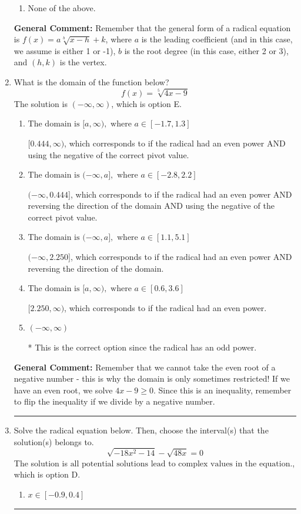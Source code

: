\documentclass{extbook}[14pt]
\newcommand{\litem}[1]{\item #1

\rule{\textwidth}{0.4pt}}
\begin{document}
\begin{enumerate}
{\begin{enumerate}[label=\Alph*.]
\item None of the above.\end{enumerate}
\textbf{General Comment:} Remember that the general form of a radical equation is $ f(x) = a \sqrt[b]{x - h} + k $, where $a$ is the leading coefficient (and in this case, we assume is either 1 or -1), $b$ is the root degree (in this case, either 2 or 3), and $(h, k)$ is the vertex.
}
\litem{
What is the domain of the function below?
\[ f(x) = \sqrt[5]{4 x - 9} \]
The solution is \( (-\infty, \infty) \), which is option E.\begin{enumerate}[label=\Alph*.]
\item \( \text{The domain is } [a, \infty), \text{   where } a \in [-1.7, 1.3] \)

$[0.444, \infty)$, which corresponds to if the radical had an even power AND using the negative of the correct pivot value.
\item \( \text{The domain is } (-\infty, a], \text{   where } a \in [-2.8, 2.2] \)

$(-\infty, 0.444]$, which corresponds to if the radical had an even power AND reversing the direction of the domain AND using the negative of the correct pivot value.
\item \( \text{The domain is } (-\infty, a], \text{   where } a \in [1.1, 5.1] \)

$(-\infty, 2.250]$, which corresponds to if the radical had an even power AND reversing the direction of the domain.
\item \( \text{The domain is } [a, \infty), \text{   where } a \in [0.6, 3.6] \)

$[2.250, \infty)$, which corresponds to if the radical had an even power.
\item \( (-\infty, \infty) \)

* This is the correct option since the radical has an odd power.
\end{enumerate}

\textbf{General Comment:} Remember that we cannot take the even root of a negative number - this is why the domain is only sometimes restricted! If we have an even root, we solve $4 x - 9 \geq 0$. Since this is an inequality, remember to flip the inequality if we divide by a negative number.
}
\litem{
Solve the radical equation below. Then, choose the interval(s) that the solution(s) belongs to.
\[ \sqrt{-18 x^2 - 14} - \sqrt{48 x} = 0 \]
The solution is \( \text{all potential solutions lead to complex values in the equation.} \), which is option D.\begin{enumerate}[label=\Alph*.]
\item \( x \in [-0.9,0.4] \)


\end{enumerate}}
\end{enumerate}
\end{document}
